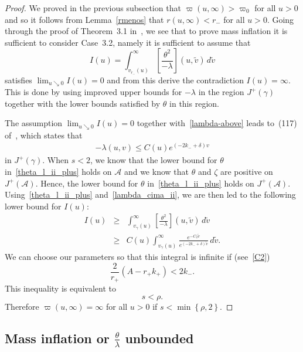 \documentclass[a4paper,11pt,oneside,reqno]{amsart}
\newcommand{\s}{s}
\newcommand{\kk}{k_+}
\newcommand{\kkk}{k_-}
\newcommand{\cal}{\mathcal}
\newcommand{\ckrm}{\check r_-}
\newcommand{\vgr}{v_{\ckrm}}
\newcommand{\gam}{\gamma}
\newcommand{\vgam}{v_{\gam}}
\begin{document}
\begin{proof}
We proved in the previous subsection that 
$\varpi(u,\infty)>\varpi_0$ for all $u>0$ and so it follows from Lemma~\ref{rmenos}
that $r(u,\infty)<r_-$ for all $u>0$. Going through the proof of 
Theorem~3.1 in~\cite{relIst3}, we see that to prove mass inflation it is sufficient to
consider Case~3.2, namely it is sufficient to assume that
$$
I(u)=\int_{\vgr(u)}^\infty\left[\frac{\theta^2}{-\lambda}\right](u,\tilde v)\,d\tilde v
$$
satisfies $\lim_{u\searrow 0}I(u)=0$ and from this derive the contradiction
$I(u)=\infty$. This is done by using improved upper bounds for $-\lambda$
in the region $J^+(\gamma)$ together with the lower bounds satisfied by $\theta$ in
this region.

The assumption $\lim_{u\searrow 0}I(u)=0$ together with~\eqref{lambda-above} leads
to~(117) of~\cite{relIst3}, which states that
\begin{eqnarray}
-\lambda(u,v)\leq C(u)
e^{(-2\kkk+\delta)v}\label{lambda_cima_ii}
\end{eqnarray}
in $J^+(\gamma)$.
When $\s<2$, we know that the lower bound for $\theta$ 
in~\eqref{theta_l_ii_plus} holds on ${\cal A}$
and we know that $\theta$ and $\zeta$ are positive on $J^+({\cal A})$. Hence,
the lower bound for $\theta$ 
in~\eqref{theta_l_ii_plus} holds on $J^+({\cal A})$.
Using~\eqref{theta_l_ii_plus} and~\eqref{lambda_cima_ii}, we are then led to the following lower bound for 
$I(u)$:
\begin{eqnarray*}
I(u)&\geq&\int_{\vgam(u)}^\infty\left[\frac{\theta^2}{-\lambda}\right](u,\tilde v)\,d\tilde v\\
&\geq&C(u)\int_{\vgam(u)}^\infty\frac{e^{-C_2\tilde v}}{e^{(-2\kkk+\delta)\tilde v}}\,d\tilde v.
\end{eqnarray*}
We can choose our parameters so that this integral is infinite if (see~\eqref{C2})
$$\textstyle
\frac{2}{r_+}(A-r_+\kk)<2\kkk.
$$
This inequality is equivalent to 
$$
\s<\rho.
$$
Therefore
$\varpi(u,\infty)=\infty$ for all $u>0$ if $s<\min\left\{\rho,2\right\}$.
\end{proof}

\subsection{Mass inflation or $\frac{\theta}{\lambda}$ unbounded}
\end{document}
